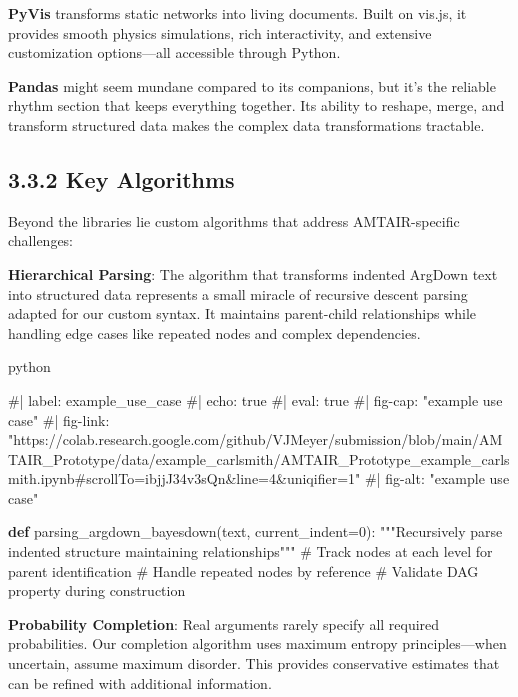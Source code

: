 \documentclass[
  11pt,
  letterpaper,
]{book}
\newenvironment{Shaded}{\begin{snugshade}}{\end{snugshade}}
\newcommand{\CommentTok}[1]{\textcolor[rgb]{0.37,0.37,0.37}{#1}}
\newcommand{\DecValTok}[1]{\textcolor[rgb]{0.68,0.00,0.00}{#1}}
\newcommand{\KeywordTok}[1]{\textcolor[rgb]{0.00,0.23,0.31}{\textbf{#1}}}
\newcommand{\NormalTok}[1]{\textcolor[rgb]{0.00,0.23,0.31}{#1}}
\newcommand{\OperatorTok}[1]{\textcolor[rgb]{0.37,0.37,0.37}{#1}}
\begin{document}
\textbf{PyVis} transforms static networks into living documents. Built
on vis.js, it provides smooth physics simulations, rich interactivity,
and extensive customization options---all accessible through Python.

\textbf{Pandas} might seem mundane compared to its companions, but it's
the reliable rhythm section that keeps everything together. Its ability
to reshape, merge, and transform structured data makes the complex data
transformations tractable.

\subsection{3.3.2 Key Algorithms}\label{sec-key-algorithms}

Beyond the libraries lie custom algorithms that address AMTAIR-specific
challenges:

\textbf{Hierarchical Parsing}: The algorithm that transforms indented
ArgDown text into structured data represents a small miracle of
recursive descent parsing adapted for our custom syntax. It maintains
parent-child relationships while handling edge cases like repeated nodes
and complex dependencies.

python

\begin{Shaded}
\begin{Highlighting}[]
\CommentTok{\#| label: example\_use\_case}
\CommentTok{\#| echo: true}
\CommentTok{\#| eval: true}
\CommentTok{\#| fig{-}cap: "example use case"}
\CommentTok{\#| fig{-}link: "https://colab.research.google.com/github/VJMeyer/submission/blob/main/AMTAIR\_Prototype/data/example\_carlsmith/AMTAIR\_Prototype\_example\_carlsmith.ipynb\#scrollTo=ibjjJ34v3sQn\&line=4\&uniqifier=1"}
\CommentTok{\#| fig{-}alt: "example use case"}

\KeywordTok{def}\NormalTok{ parsing\_argdown\_bayesdown(text, current\_indent}\OperatorTok{=}\DecValTok{0}\NormalTok{):}
    \CommentTok{"""Recursively parse indented structure maintaining relationships"""}
    \CommentTok{\# Track nodes at each level for parent identification}
    \CommentTok{\# Handle repeated nodes by reference}
    \CommentTok{\# Validate DAG property during construction}
\end{Highlighting}
\end{Shaded}

\textbf{Probability Completion}: Real arguments rarely specify all
required probabilities. Our completion algorithm uses maximum entropy
principles---when uncertain, assume maximum disorder. This provides
conservative estimates that can be refined with additional information.
\end{document}
